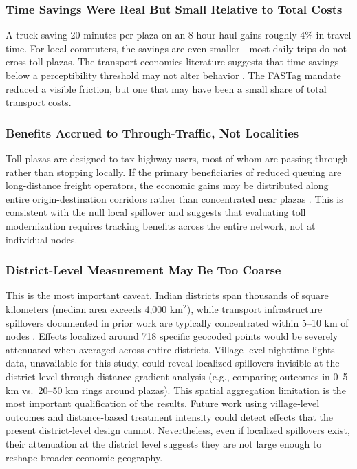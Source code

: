 \documentclass[12pt]{article}
\begin{document}
\subsubsection*{Time Savings Were Real But Small Relative to Total Costs} A truck saving 20 minutes per plaza on an 8-hour haul gains roughly 4\% in travel time. For local commuters, the savings are even smaller---most daily trips do not cross toll plazas. The transport economics literature suggests that time savings below a perceptibility threshold may not alter behavior \citep{small2012valuation}. The FASTag mandate reduced a visible friction, but one that may have been a small share of total transport costs.

\subsubsection*{Benefits Accrued to Through-Traffic, Not Localities} Toll plazas are designed to tax highway users, most of whom are passing through rather than stopping locally. If the primary beneficiaries of reduced queuing are long-distance freight operators, the economic gains may be distributed along entire origin-destination corridors rather than concentrated near plazas \citep{allen2020universal}. This is consistent with the null local spillover and suggests that evaluating toll modernization requires tracking benefits across the entire network, not at individual nodes.

\subsubsection*{District-Level Measurement May Be Too Coarse} This is the most important caveat. Indian districts span thousands of square kilometers (median area exceeds 4,000 km$^2$), while transport infrastructure spillovers documented in prior work are typically concentrated within 5--10 km of nodes \citep{redding2017quantitative}. Effects localized around 718 specific geocoded points would be severely attenuated when averaged across entire districts. Village-level nighttime lights data, unavailable for this study, could reveal localized spillovers invisible at the district level through distance-gradient analysis (e.g., comparing outcomes in 0--5 km vs.\ 20--50 km rings around plazas). This spatial aggregation limitation is the most important qualification of the results. Future work using village-level outcomes and distance-based treatment intensity could detect effects that the present district-level design cannot. Nevertheless, even if localized spillovers exist, their attenuation at the district level suggests they are not large enough to reshape broader economic geography.
\end{document}
